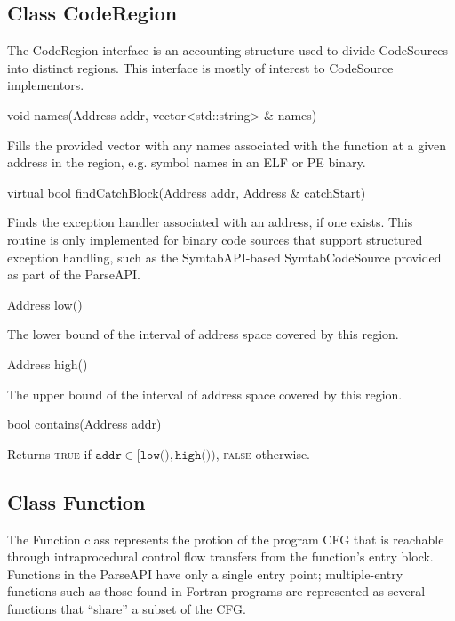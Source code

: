 \documentclass{article}
\newenvironment{apient}{\small\verbatim}{\endverbatim}
\newcommand{\apidesc}[1]{%
{\addtolength{\leftskip}{4em}%
#1\par\medskip}
}
\begin{document}
\subsection{Class CodeRegion}

The CodeRegion interface is an accounting structure used to divide CodeSources into distinct regions. This interface is mostly of interest to CodeSource implementors.

\begin{apient}
void names(Address addr, vector<std::string> & names)
\end{apient}
\apidesc{Fills the provided vector with any names associated with the function at a given address in the region, e.g. symbol names in an ELF or PE binary.}

\begin{apient}
virtual bool findCatchBlock(Address addr, Address & catchStart)
\end{apient}
\apidesc{Finds the exception handler associated with an address, if one exists. This routine is only implemented for binary code sources that support structured exception handling, such as the SymtabAPI-based SymtabCodeSource provided as part of the ParseAPI.}

\begin{apient}
Address low()
\end{apient}
\apidesc{The lower bound of the interval of address space covered by this region.}

\begin{apient}
Address high()
\end{apient}
\apidesc{The upper bound of the interval of address space covered by this region.}

\begin{apient}
bool contains(Address addr)
\end{apient}
\apidesc{Returns {\scshape true} if $\texttt{addr} \in [\texttt{low()},\texttt{high()})$, {\scshape false} otherwise.}

\subsection{Class Function}

The Function class represents the protion of the program CFG that is reachable through intraprocedural control flow transfers from the function's entry block. Functions in the ParseAPI have only a single entry point; multiple-entry functions such as those found in Fortran programs are represented as several functions that ``share'' a subset of the CFG. 
\end{document}
